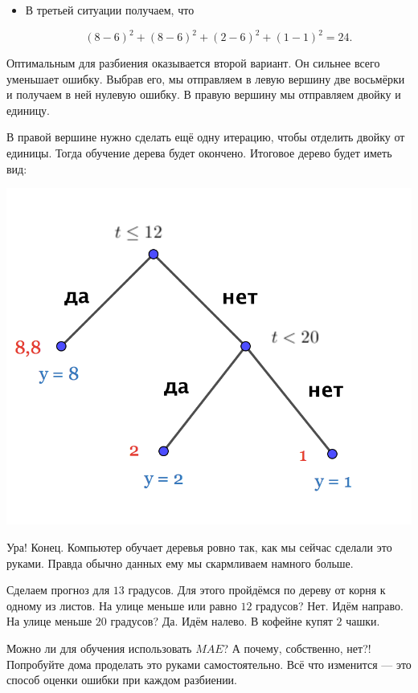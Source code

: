 \documentclass[12pt, a4paper, oneside]{article}
\theoremstyle{plain} %
\theoremstyle{definition}
\begin{document}
\begin{solution}
\begin{itemize}
	\item В третьей ситуации получаем, что 
	
   $$ 
   (8 - 6)^2 + (8 - 6)^2 + (2 - 6)^2 + (1 - 1)^2 = 24.
   $$
\end{itemize}
	
Оптимальным для разбиения оказывается второй вариант. Он сильнее всего уменьшает ошибку.  Выбрав его, мы отправляем в левую вершину две восьмёрки и получаем в ней нулевую ошибку. В правую вершину мы отправляем двойку и единицу. 
	
В правой вершине нужно сделать ещё одну итерацию, чтобы отделить двойку от единицы. Тогда обучение дерева будет окончено. Итоговое дерево будет иметь вид: 
	
\begin{center}
	\includegraphics[scale=0.23]{reg_tree_2.png}
\end{center}

Ура! Конец. Компьютер обучает деревья ровно так, как мы сейчас сделали это руками. Правда обычно данных ему мы скармливаем намного больше. 
	
Сделаем прогноз для $13$ градусов.  Для этого пройдёмся по дереву от корня к одному из листов. На улице меньше или равно $12$ градусов?  Нет. Идём направо. На улице меньше $20$ градусов? Да. Идём налево. В кофейне купят $2$ чашки. 

Можно ли для обучения использовать $MAE$? А почему, собственно, нет?! Попробуйте дома проделать это руками самостоятельно. Всё что изменится --- это способ оценки ошибки при каждом разбиении.


\end{solution}
\end{document}
